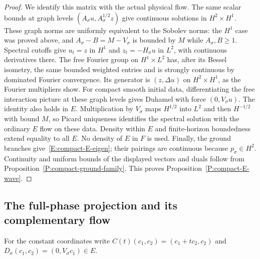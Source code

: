 \begin{proof}
  We identify this matrix with the actual physical flow.
  The same scalar bounds at graph levels
  $(A_\sigma u,A_\sigma^{1/2}z)$ give continuous solutions in
  $H^2\times H^1$. These graph norms are uniformly equivalent to
  the Sobolev norms: the $H^1$ case was proved above, and
  $A_\sigma-B=M-V_\sigma$ is bounded by $M$ while $A_\sigma,B\ge1$.
  Spectral cutoffs give $u_t=z$ in $H^1$ and $z_t=-H_\sigma u$ in
  $L^2$, with continuous derivatives there.
  The free Fourier group on $H^1\times L^2$ has, after its Bessel
  isometry, the same bounded weighted entries and is strongly
  continuous by dominated Fourier convergence. Its generator is
  $(z,\Delta u)$ on $H^2\times H^1$, as the Fourier multipliers
  show. For compact smooth initial data, differentiating the free
  interaction picture at these graph levels gives Duhamel with force
  $(0,V_\sigma u)$. The identity also holds in $E$.
  Multiplication by $V_\sigma$ maps $H^{1/2}$ into $L^2$ and then
  $H^{-1/2}$ with bound $M$, so Picard uniqueness identifies the
  spectral solution with the ordinary $E$ flow on these data.
  Density within $E$ and finite-horizon boundedness extend equality
  to all $E$. No density of $E$ in $F$ is used.
  Finally, the ground branches give~\eqref{E:compact-E-eigen};
  their pairings are continuous because $p_\sigma\in H^2$.
  Continuity and uniform bounds of the displayed vectors and duals
  follow from Proposition~\ref{P:compact-ground-family}.
  This proves Proposition~\ref{P:compact-E-wave}.
\end{proof}

\subsection{The full-phase projection and its complementary flow}

For the constant coordinates write
$C(t)(c_1,c_2)=(c_1+tc_2,c_2)$ and
$D_\sigma(c_1,c_2)=(0,V_\sigma c_1)\in E$.

